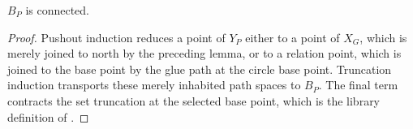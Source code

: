 \begin{proposition}
$B_P$ is connected.
\end{proposition}
\begin{proof}
Pushout induction reduces a point of $Y_P$ either to a point of $X_G$, which
is merely joined to north by the preceding lemma, or to a relation point,
which is joined to the base point by the glue path at the circle base point.
Truncation induction transports these merely inhabited path spaces to $B_P$.
The final term contracts the set truncation at the selected base point, which
is the library definition of .
\end{proof}
